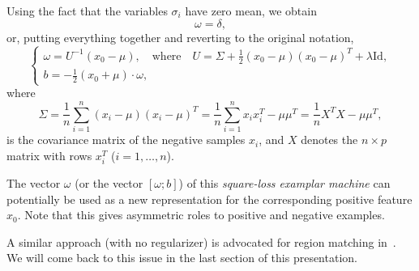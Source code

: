 \documentclass[12pt,letterpaper]{article}
\begin{document}
Using the fact that the variables $\sigma_i$ have zero
mean, we obtain
\begin{equation}
[\frac{1}{n}\sum_{i=1}^n\sigma_i\sigma_i^T +\frac{1}{2}\delta\delta^T +\lambda\text{Id}]
\omega=\delta,
\end{equation}
or, putting everything together and reverting to the original notation,
\begin{equation}
\left\{\begin{array}{l}
\displaystyle \omega=U^{-1} (x_0-\mu),\quad\text{where}\quad
U=\Sigma
+\frac{1}{2}(x_0-\mu)(x_0-\mu)^T +\lambda\text{Id},\\
\displaystyle b=-\frac{1}{2}(x_0+\mu)\cdot \omega,
\end{array}\right.
\label{eq:final}
\end{equation} 
where 
\begin{equation}
\Sigma=\frac{1}{n}\sum_{i=1}^n(x_i-\mu)(x_i-\mu)^T
=\frac{1}{n}\sum_{i=1}^n x_ix_i^T-\mu\mu^T=\frac{1}{n}X^TX-\mu\mu^T,
\label{eq:Sigmadef}
\end{equation}
is the covariance matrix of the negative samples $x_i$, and
$X$ denotes the $n\times p$ matrix with rows $x_i^T$ ($i=1,\ldots,n$).

The vector $\omega$ (or the vector $[\omega;b]$) of this {\em square-loss
examplar machine} can potentially be used as a new representation for
the corresponding positive feature $x_0$. Note that this gives
asymmetric roles to positive and negative examples.

A similar approach (with no regularizer) is advocated for region
matching in~\cite{ARS14}.  We will come back to this issue in the last
section of this presentation.
\end{document}
